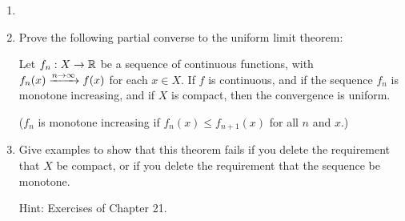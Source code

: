 \documentclass[a4paper, 12pt]{article}
\begin{document}
\begin{problem} 
    \begin{enumerate}
    \item []
    \item Prove the following partial converse to the uniform limit theorem:
    
    Let $f_n: X \to \mathbb{R}$ be a sequence of continuous functions, with $f_n(x) \xrightarrow{n \to \infty} f(x)$ for each $x \in X$. If $f$ is continuous, and if the sequence $f_n$ is monotone increasing, and if $X$ is compact, then the convergence is uniform.

    ($f_n$ is monotone increasing if $f_n(x) \leq f_{n+1}(x)$ for all $n$ and $x$.)
    \item Give examples to show that this theorem fails if you delete the requirement that $X$ be compact, or if you delete the requirement that the sequence be monotone.
    
    Hint: Exercises of Chapter 21.
    \end{enumerate}
\end{problem}
\end{document}
